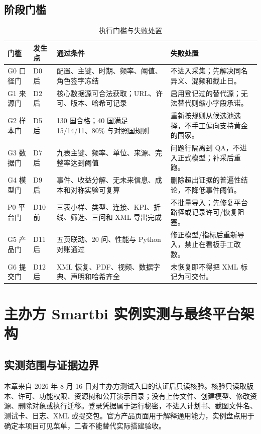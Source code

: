 \documentclass[UTF8,fontset=windows,12pt,openany]{ctexbook}
\begin{document}
\section{阶段门槛}

\begin{longtable}{p{1.8cm}p{3.3cm}p{5.0cm}p{3.4cm}}
\caption{执行门槛与失败处置}\label{tab:gates}\\
\toprule
\textbf{门槛} & \textbf{发生点} & \textbf{通过条件} & \textbf{失败处置}\\
\midrule
G0 口径门 & D0 后 & 配置、主键、时期、频率、阈值、角色签字冻结 & 不进入采集；先解决同名异义、混频和截止日。\\
G1 来源门 & D2 后 & 核心数据源可合法获取；URL、许可、版本、哈希可记录 & 启用登记过的替代源；无法替代则缩小字段承诺。\\
G2 样本门 & D5 后 & 130 国合格；40 国满足 15/14/11、80\% 与对照国规则 & 重新按规则从候选池选择，不手工偏向支持黄金的国家。\\
G3 数据门 & D7 后 & 九表主键、频率、单位、来源、完整率达到阈值 & 问题行隔离到 QA，不进入正式模型；补采后重跑。\\
G4 模型门 & D9 后 & 事件、收益分解、无未来信息、成本和对称实验可复算 & 删除超出证据的普遍性结论，不降低事件阈值。\\
P0 平台门 & D10 前 & 三表小样、类型、连接、KPI、折线、筛选、三问和 XML 导出完成 & 不批量导入；先修复平台路径或记录许可/恢复阻塞。\\
G5 产品门 & D11 后 & 五页联动、20 问、性能与 Python 对账通过 & 修正模型/指标后重新导入，禁止在看板手工改数。\\
G6 提交门 & D12 后 & XML 恢复、PDF、视频、数据字典、声明和哈希齐全 & 未恢复即不得把 XML 标记为可交付。\\
\bottomrule
\end{longtable}

\chapter{主办方 Smartbi 实例实测与最终平台架构}

\section{实测范围与证据边界}

本章来自 2026 年 8 月 16 日对主办方测试入口的认证后只读核验。核验只读取版本、许可、功能权限、资源树和公开演示目录；没有上传文件、创建模型、修改资源、删除对象或执行迁移。登录凭据属于运行秘密，不进入计划书、截图文件名、测试卡、日志、XML 或提交包。官方产品页面用于解释通用能力，实例盘点用于确定本项目可见菜单，二者不能替代实际搭建验收\cite{smartbiversion,smartbiprepare,smartbiaichat,smartbiinstance}。
\end{document}
